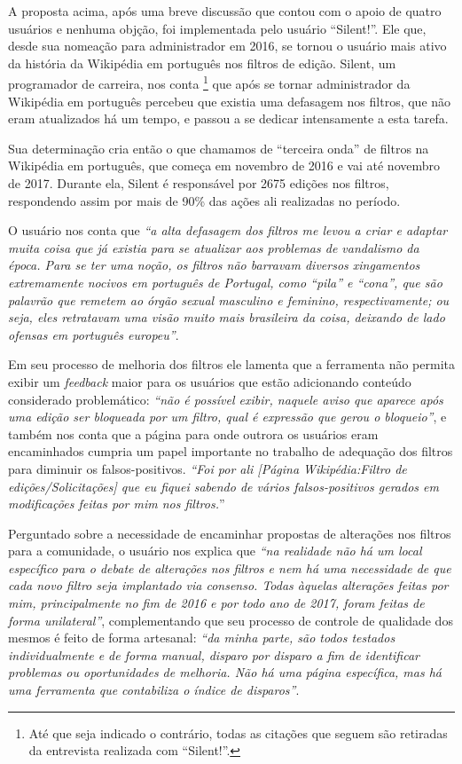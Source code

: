 A proposta acima, após uma breve discussão que contou com o apoio de quatro usuários e nenhuma objção, foi implementada pelo usuário “Silent!”. Ele que, desde sua nomeação para administrador em 2016, se tornou o usuário mais ativo da história da Wikipédia em português nos filtros de edição. Silent, um programador de carreira, nos conta \footnote{Até que seja indicado o contrário, todas as citações que seguem são retiradas da entrevista realizada com ``Silent!''.} que após se tornar administrador da Wikipédia em português percebeu que existia uma defasagem nos filtros, que não eram atualizados há um tempo, e passou a se dedicar intensamente a esta tarefa.

Sua determinação cria então o que chamamos de “terceira onda” de filtros na Wikipédia em português, que começa em novembro de 2016 e vai até novembro de 2017. Durante ela, Silent é responsável por 2675 edições nos filtros, respondendo assim por mais de 90\% das ações ali realizadas no período.

O usuário nos conta que \textit{“a alta defasagem dos filtros me levou a criar e adaptar muita coisa que já existia para se atualizar aos problemas de vandalismo da época. Para se ter uma noção, os filtros não barravam diversos xingamentos extremamente nocivos em português de Portugal, como “pila” e “cona”, que são palavrão que remetem ao órgão sexual masculino e feminino, respectivamente; ou seja, eles retratavam uma visão muito mais brasileira da coisa, deixando de lado ofensas em português europeu”}.

Em seu processo de melhoria dos filtros ele lamenta que a ferramenta não permita exibir um \textit{feedback} maior para os usuários que estão adicionando conteúdo considerado problemático: \textit{“não é possível exibir, naquele aviso que aparece após uma edição ser bloqueada por um filtro, qual é expressão que gerou o bloqueio”}, e também nos conta que a página para onde outrora os usuários eram encaminhados cumpria um papel importante no trabalho de adequação dos filtros para diminuir os falsos-positivos. \textit{“Foi por ali [Página Wikipédia:Filtro de edições/Solicitações] que eu fiquei sabendo de vários falsos-positivos gerados em modificações feitas por mim nos filtros.}”

Perguntado sobre a necessidade de encaminhar propostas de alterações nos filtros para a comunidade, o usuário nos explica que \textit{“na realidade não há um local específico para o debate de alterações nos filtros e nem há uma necessidade de que cada novo filtro seja implantado via consenso. Todas àquelas alterações feitas por mim, principalmente no fim de 2016 e por todo ano de 2017, foram feitas de forma unilateral”}, complementando que seu processo de controle de qualidade dos mesmos é feito de forma artesanal: \textit{“da minha parte, são todos testados individualmente e de forma manual, disparo por disparo a fim de identificar problemas ou oportunidades de melhoria. Não há uma página específica, mas há uma ferramenta que contabiliza o índice de disparos”}.

